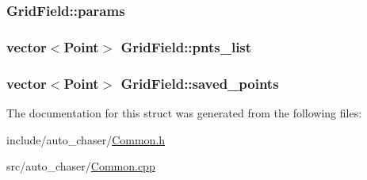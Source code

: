 \subsubsection[{\texorpdfstring{params}{params}}]{ Grid\+Field\+::params}\hypertarget{struct_grid_field_a735e3033049d10f084e74083ae44dd21}{}\label{struct_grid_field_a735e3033049d10f084e74083ae44dd21}
\subsubsection[{\texorpdfstring{pnts\+\_\+list}{pnts_list}}]{\setlength{\rightskip}{0pt plus 5cm}vector$<$Point$>$ Grid\+Field\+::pnts\+\_\+list}\hypertarget{struct_grid_field_a76901c3a463e8cbe456c8f73bc264380}{}\label{struct_grid_field_a76901c3a463e8cbe456c8f73bc264380}
\subsubsection[{\texorpdfstring{saved\+\_\+points}{saved_points}}]{\setlength{\rightskip}{0pt plus 5cm}vector$<$Point$>$ Grid\+Field\+::saved\+\_\+points}\hypertarget{struct_grid_field_ad5dc16fb46eef17df3a554f5b5604611}{}\label{struct_grid_field_ad5dc16fb46eef17df3a554f5b5604611}


The documentation for this struct was generated from the following files\+:\begin{DoxyCompactItemize}
\item 
include/auto\+\_\+chaser/\hyperlink{_common_8h}{Common.\+h}\item 
src/auto\+\_\+chaser/\hyperlink{_common_8cpp}{Common.\+cpp}\end{DoxyCompactItemize}
